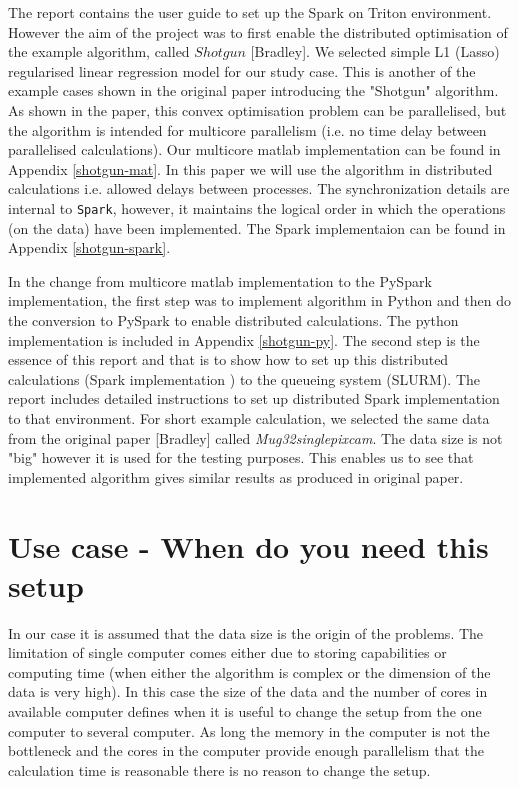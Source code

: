 \documentclass[a4paper,11pt]{article}
\begin{document}
The report contains the user guide to set up the Spark on Triton environment. However the aim of the project was to first enable the distributed optimisation of the example algorithm, called $Shotgun$ [Bradley]. We selected simple L1 (Lasso) regularised linear regression model for our study case. This is another of the example cases shown in the original paper introducing the "Shotgun" algorithm. As shown in the paper, this convex optimisation problem can be parallelised, but the algorithm is intended for multicore  parallelism (i.e. no time delay between parallelised calculations). Our multicore matlab implementation can be found in  Appendix \ref{shotgun-mat}. In this paper we will use the algorithm in distributed calculations i.e. allowed delays between processes. The synchronization details are internal to \texttt{Spark}, however, it maintains the logical order in which the operations (on the data) have been implemented. The Spark implementaion can be found in Appendix \ref{shotgun-spark}. 

In the change from multicore matlab implementation to the PySpark implementation, the first step was to implement algorithm in Python and then do the conversion to PySpark to enable distributed calculations. The python implementation is included in Appendix \ref{shotgun-py}. The second step is the essence of this report and that is to show how to set up this distributed calculations (Spark implementation ) to the queueing system (SLURM). The report includes detailed instructions to set up distributed Spark implementation to that environment. For short example calculation, we selected the same data from the original paper [Bradley] called \textit{Mug32singlepixcam}. The data size is not "big" however it is used for the testing purposes. This enables us to see that implemented algorithm gives similar results as produced in original paper. 

\section{Use case - When do you need this setup}

In our case it is assumed that the data size is the origin of the problems. The limitation of single computer comes either due to storing capabilities or computing time (when either the algorithm is complex or the dimension of the data is very high). In this case the size of the data and the number of cores in available computer defines when it is useful to change the setup from the one computer to several computer. As long the memory in the computer is not the bottleneck 
and the cores in the computer provide enough parallelism that the 
calculation time is reasonable there is no reason to change the setup.
 
\end{document}
